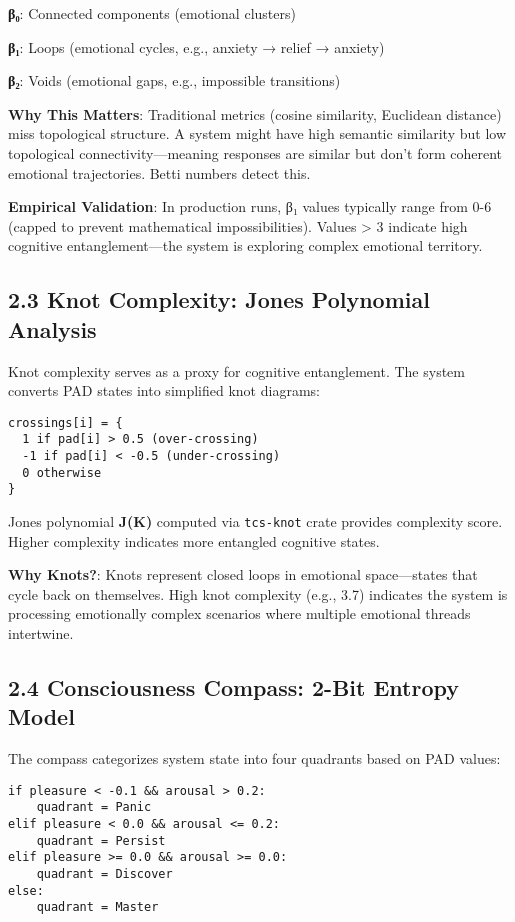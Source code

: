 \documentclass[11pt,a4paper]{article}
\begin{document}
\item \textbf{β₀}: Connected components (emotional clusters)
\item \textbf{β₁}: Loops (emotional cycles, e.g., anxiety → relief → anxiety)
\item \textbf{β₂}: Voids (emotional gaps, e.g., impossible transitions)

\textbf{Why This Matters}: Traditional metrics (cosine similarity, Euclidean distance) miss topological structure. A system might have high semantic similarity but low topological connectivity—meaning responses are similar but don't form coherent emotional trajectories. Betti numbers detect this.

\textbf{Empirical Validation}: In production runs, β₁ values typically range from 0-6 (capped to prevent mathematical impossibilities). Values > 3 indicate high cognitive entanglement—the system is exploring complex emotional territory.

\subsection{2.3 Knot Complexity: Jones Polynomial Analysis}

Knot complexity serves as a proxy for cognitive entanglement. The system converts PAD states into simplified knot diagrams:

\begin{verbatim}crossings[i] = {
  1 if pad[i] > 0.5 (over-crossing)
  -1 if pad[i] < -0.5 (under-crossing)
  0 otherwise
}
\end{verbatim}

Jones polynomial \textbf{J(K)} computed via \texttt{tcs-knot} crate provides complexity score. Higher complexity indicates more entangled cognitive states.

\textbf{Why Knots?}: Knots represent closed loops in emotional space—states that cycle back on themselves. High knot complexity (e.g., 3.7) indicates the system is processing emotionally complex scenarios where multiple emotional threads intertwine.

\subsection{2.4 Consciousness Compass: 2-Bit Entropy Model}

The compass categorizes system state into four quadrants based on PAD values:

\begin{verbatim}if pleasure < -0.1 && arousal > 0.2:
    quadrant = Panic
elif pleasure < 0.0 && arousal <= 0.2:
    quadrant = Persist
elif pleasure >= 0.0 && arousal >= 0.0:
    quadrant = Discover
else:
    quadrant = Master
\end{verbatim}
\end{document}
